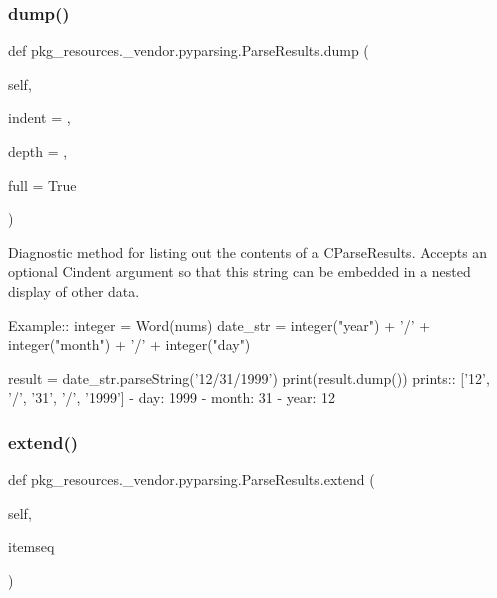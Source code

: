 \subsubsection{\texorpdfstring{dump()}{dump()}}
{\footnotesize\ttfamily def pkg\+\_\+resources.\+\_\+vendor.\+pyparsing.\+Parse\+Results.\+dump (\begin{DoxyParamCaption}\item[{}]{self,  }\item[{}]{indent = {\ttfamily \textquotesingle{}\textquotesingle{}},  }\item[{}]{depth = {},  }\item[{}]{full = {\ttfamily True} }\end{DoxyParamCaption})}

\begin{DoxyVerb}Diagnostic method for listing out the contents of a C{ParseResults}.
Accepts an optional C{indent} argument so that this string can be embedded
in a nested display of other data.

Example::
    integer = Word(nums)
    date_str = integer("year") + '/' + integer("month") + '/' + integer("day")
    
    result = date_str.parseString('12/31/1999')
    print(result.dump())
prints::
    ['12', '/', '31', '/', '1999']
    - day: 1999
    - month: 31
    - year: 12
\end{DoxyVerb}
 \mbox{\label{classpkg__resources_1_1__vendor_1_1pyparsing_1_1_parse_results_ab364b8acde3167bcd176f82ea6e1b422}} 
\subsubsection{\texorpdfstring{extend()}{extend()}}
{\footnotesize\ttfamily def pkg\+\_\+resources.\+\_\+vendor.\+pyparsing.\+Parse\+Results.\+extend (\begin{DoxyParamCaption}\item[{}]{self,  }\item[{}]{itemseq }\end{DoxyParamCaption})}

